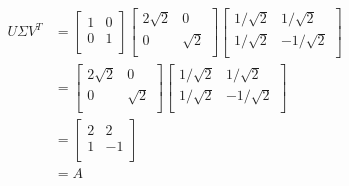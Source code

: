 \documentclass[11pt]{article}
\begin{document}
$$\begin{aligned}
U \Sigma V^T &= \begin{bmatrix}
1 & 0 \\
0 & 1 \\
\end{bmatrix} \begin{bmatrix}
2 \sqrt2 & 0 \\
0 & \sqrt2 \\
\end{bmatrix} \begin{bmatrix}
1 / \sqrt2 & 1 / \sqrt2 \\
1 / \sqrt2 & -1 / \sqrt2 \\
\end{bmatrix} \\
&= \begin{bmatrix}
2 \sqrt2 & 0 \\
0 & \sqrt2 \\
\end{bmatrix} \begin{bmatrix}
1 / \sqrt2 & 1 / \sqrt2 \\
1 / \sqrt2 & -1 / \sqrt2 \\
\end{bmatrix} \\
&= \begin{bmatrix}
2 & 2 \\
1 & -1 \\
\end{bmatrix} \\
&= \boxed{A}
\end{aligned} $$
\end{document}
